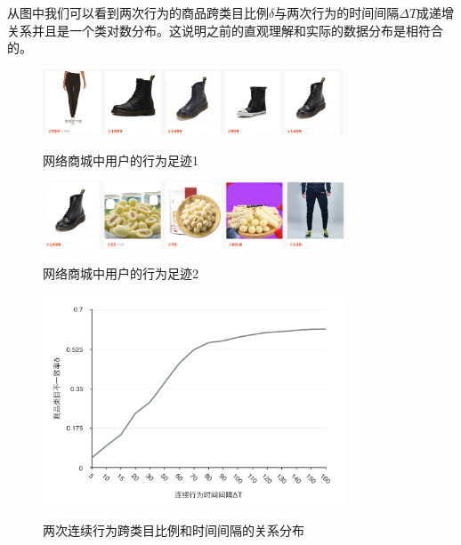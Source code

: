 从图中我们可以看到两次行为的商品跨类目比例$\delta$与两次行为的时间间隔$\Delta T$成递增关系并且是一个类对数分布。这说明之前的直观理解和实际的数据分布是相符合的。
\begin{figure}[!htp]
\centering
  \includegraphics[width=0.8\textwidth]{./graph/zuji1.png}\\
  \caption{网络商城中用户的行为足迹1}
\label{fig:zuji1}
\end{figure}
\begin{figure}[!htp]
\centering
  \includegraphics[width=0.8\textwidth]{./graph/zuji2.png}\\
  \caption{网络商城中用户的行为足迹2}
\label{fig:zuji2}
\end{figure}
\begin{figure}[!htp]
\centering
  \includegraphics[width=0.8\textwidth]{./graph/TimeDelta.png}\\
  \caption{两次连续行为跨类目比例和时间间隔的关系分布}
\label{fig:TimeDelta}
\end{figure}
\ifx\usechapbib\empty
\nocite{BSTcontrol}
\setcounter{NAT@ctr}{0}


\fi
